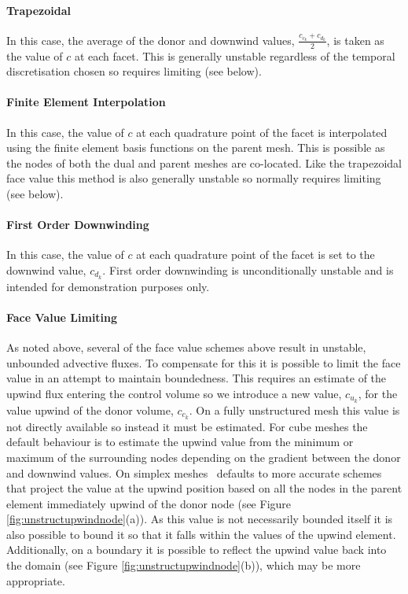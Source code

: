 \paragraph{Trapezoidal}

In this case, the average of the donor and downwind values, $\frac{c_{c_k}+c_{d_k}}{2}$, is taken as the value of $c$ at each facet.  This is generally unstable regardless of the temporal discretisation chosen so requires limiting (see below).

\paragraph{Finite Element Interpolation}

In this case, the value of $c$ at each quadrature point of the facet is interpolated using the finite element basis functions on the parent mesh.  This is possible as the nodes of both the dual and parent meshes are co-located.  Like the trapezoidal face value this method is also generally unstable so normally requires limiting (see below).

\paragraph{First Order Downwinding}

In this case, the value of $c$ at each quadrature point of the facet is set to the downwind value, $c_{d_k}$.  First order downwinding is unconditionally unstable and is intended for demonstration purposes only.

\paragraph{Face Value Limiting}

As noted above, several of the face value schemes above result in unstable, unbounded advective fluxes.  To compensate for this it is possible to limit the face value in an attempt to maintain boundedness.  This requires an estimate of the upwind flux entering the control volume so we introduce a new value, $c_{u_k}$, for the value upwind of the donor volume, $c_{c_k}$.  On a fully unstructured mesh this value is not directly available so instead it must be estimated.  For cube meshes the default behaviour is to estimate the upwind value from the minimum or maximum of the surrounding nodes depending on the gradient between the donor and downwind values.  On simplex meshes \fluidity\ defaults to more accurate schemes that project the value at the upwind position based on all the nodes in the parent element immediately upwind of the donor node (see Figure \ref{fig:unstructupwindnode}(a)).  As this value is not necessarily bounded itself it is also possible to bound it so that it falls within the values of the upwind element.  Additionally, on a boundary it is possible to reflect the upwind value back into the domain (see Figure \ref{fig:unstructupwindnode}(b)), which may be more appropriate.

